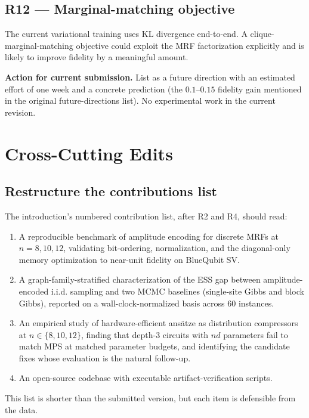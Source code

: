 \documentclass[conference,10pt]{IEEEtran}
\begin{document}
\subsection{R12 --- Marginal-matching objective}

The current variational training uses KL divergence end-to-end. A
clique-marginal-matching objective could exploit the MRF factorization
explicitly and is likely to improve fidelity by a meaningful amount.

\textbf{Action for current submission.} List as a future direction with
an estimated effort of one week and a concrete prediction (the
$0.1$--$0.15$ fidelity gain mentioned in the original future-directions
list). No experimental work in the current revision.

\section{Cross-Cutting Edits}

\subsection{Restructure the contributions list}

The introduction's numbered contribution list, after R2 and R4, should
read:
\begin{enumerate}[leftmargin=*]
    \item A reproducible benchmark of amplitude encoding for discrete
    MRFs at $n = 8, 10, 12$, validating bit-ordering, normalization, and
    the diagonal-only memory optimization to near-unit fidelity on
    BlueQubit SV.
    \item A graph-family-stratified characterization of the ESS gap
    between amplitude-encoded i.i.d. sampling and two MCMC baselines
    (single-site Gibbs and block Gibbs), reported on a wall-clock-normalized
    basis across 60 instances.
    \item An empirical study of hardware-efficient ans\"atze as
    distribution compressors at $n \in \{8, 10, 12\}$, finding that depth-3
    circuits with $nd$ parameters fail to match MPS at matched parameter
    budgets, and identifying the candidate fixes whose evaluation is the
    natural follow-up.
    \item An open-source codebase with executable artifact-verification
    scripts.
\end{enumerate}

This list is shorter than the submitted version, but each item is
defensible from the data.
\end{document}
